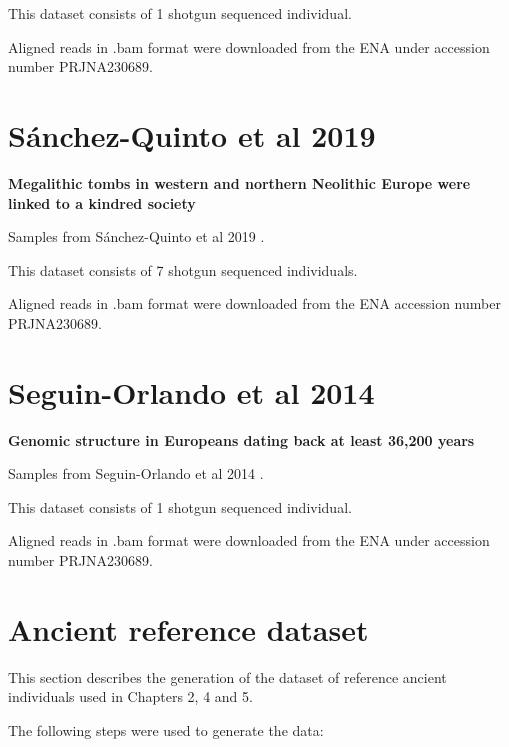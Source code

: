 This dataset consists of 1 shotgun sequenced individual.

Aligned reads in .bam format were downloaded from the ENA under accession number PRJNA230689.

\section{Sánchez-Quinto et al 2019}

\textbf{Megalithic tombs in western and northern Neolithic Europe were linked to a kindred society}

Samples from  Sánchez-Quinto et al 2019 \cite{sanchez2019megalithic}.

This dataset consists of 7 shotgun sequenced individuals.

Aligned reads in .bam format were downloaded from the ENA accession number PRJNA230689.

\section{Seguin-Orlando et al 2014}

\textbf{Genomic structure in Europeans dating back at least 36,200 years}

Samples from  Seguin-Orlando et al 2014 \cite{Seguin-Orlando2014}.

This dataset consists of 1 shotgun sequenced individual.

Aligned reads in .bam format were downloaded from the ENA under accession number PRJNA230689.

\section{Ancient reference dataset} \label{AncientReferenceDataset}

This section describes the generation of the dataset of reference ancient individuals used in Chapters 2, 4 and 5. 

The following steps were used to generate the data:

